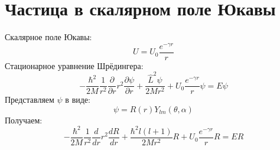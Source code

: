 \section{Частица в скалярном поле Юкавы}

Скалярное поле Юкавы:
\[
U = U_0 \frac{e^{-\gamma r}}{r}
\]
Стационарное уравнение Шрёдингера:
\[
- \frac{\hbar^2}{2M} \frac{1}{r^2} \frac{\partial}{\partial r} r^2 \frac{\partial \psi}{\partial r} + \frac{\hat{L}^2\psi}{2Mr^2} +
U_0 \frac{e^{-\gamma r}}{r} \psi = E \psi
\]
Представляем $\psi$ в виде:
\[
\psi = R(r) Y_{lm}(\theta, \alpha)
\]
Получаем:
\[
- \frac{\hbar^2}{2M} \frac{1}{r^2} \frac{d}{d r} r^2 \frac{d R}{d r} + \frac{\hbar^2 l (l+1)}{2Mr^2} R +
U_0 \frac{e^{-\gamma r}}{r} R = E R
\]